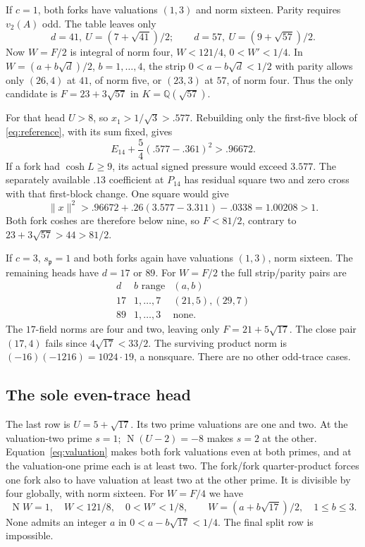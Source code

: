 \documentclass[11pt]{article}
\newcommand{\QQ}{\mathbb Q}
\newcommand{\N}{\operatorname{N}}
\begin{document}
If $c=1$, both forks have valuations $(1,3)$ and norm sixteen.
Parity requires $v_2(A)$ odd. The table leaves only
\[
 d=41,\ U=(7+\sqrt{41})/2;\qquad
 d=57,\ U=(9+\sqrt{57})/2.
\]
Now $W=F/2$ is integral of norm four,
$W<121/4$, $0<W'<1/4$.
In $W=(a+b\sqrt d)/2$, $b=1,\ldots,4$, the strip
$0<a-b\sqrt d<1/2$ with parity allows only $(26,4)$
at $41$, of norm five, or $(23,3)$ at $57$, of norm four.
Thus the only candidate is
$F=23+3\sqrt{57}$ in $K=\QQ(\sqrt{57})$.

For that head $U>8$, so $x_1>1/\sqrt3>.577$.
Rebuilding only the first-five block of
\eqref{eq:reference}, with its sum fixed, gives
\[
 E_{14}+\frac54(.577-.361)^2>.96672.
\]
If a fork had $\cosh L\ge9$, its actual signed pressure would
exceed $3.577$. The separately available $.13$ coefficient at
$P_{14}$ has residual square two and zero cross with that
first-block change. One square would give
\[
 \|x\|^2>.96672+.26(3.577-3.311)-.0338=1.00208>1.
\]
Both fork coshes are therefore below nine, so $F<81/2$,
contrary to $23+3\sqrt{57}>44>81/2$.

If $c=3$, $s_{\mathfrak p}=1$ and both forks again have
valuations $(1,3)$, norm sixteen. The remaining heads have
$d=17$ or $89$. For $W=F/2$ the full strip/parity pairs are
\[
 \begin{array}{r|c|l}
 d&b\text{ range}&(a,b)\\\hline
 17&1,\ldots,7&(21,5),(29,7)\\
 89&1,\ldots,3&\text{none}.
 \end{array}
\]
The $17$-field norms are four and two, leaving only
$F=21+5\sqrt{17}$. The close pair $(17,4)$ fails since
$4\sqrt{17}<33/2$.
The surviving product norm is
$(-16)(-1216)=1024\cdot19$, a nonsquare.
There are no other odd-trace cases.

\subsection{The sole even-trace head}
The last row is $U=5+\sqrt{17}$. Its two prime valuations
are one and two. At the valuation-two prime $s=1$;
$\N(U-2)=-8$ makes $s=2$ at the other.
Equation~\eqref{eq:valuation} makes both fork valuations even
at both primes, and at the valuation-one prime each is at least
two. The fork/fork quarter-product forces one fork also to have
valuation at least two at the other prime. It is divisible by
four globally, with norm sixteen.
For $W=F/4$ we have
\[
 \N W=1,\quad W<121/8,\quad0<W'<1/8,\qquad
 W=(a+b\sqrt{17})/2,\quad1\le b\le3.
\]
None admits an integer $a$ in $0<a-b\sqrt{17}<1/4$.
The final split row is impossible.
\end{document}
